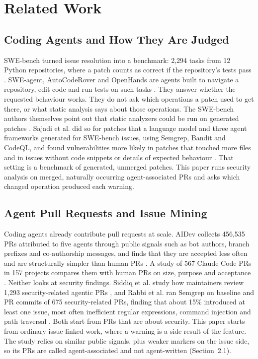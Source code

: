 \documentclass[acmsmall,screen,nonacm]{acmart}
\begin{document}
\section{Related Work}

\subsection{Coding Agents and How They Are Judged}

SWE-bench turned issue resolution into a benchmark: 2,294 tasks from 12 Python repositories, where a patch counts as correct if the repository's tests pass \cite{b9}. SWE-agent, AutoCodeRover and OpenHands are agents built to navigate a repository, edit code and run tests on such tasks \cite{b22,b25,b20}. They answer whether the requested behaviour works. They do not ask which operations a patch used to get there, or what static analysis says about those operations. The SWE-bench authors themselves point out that static analyzers could be run on generated patches \cite{b9}. Sajadi et al. did so for patches that a language model and three agent frameworks generated for SWE-bench issues, using Semgrep, Bandit and CodeQL, and found vulnerabilities more likely in patches that touched more files and in issues without code snippets or details of expected behaviour \cite{b36}. That setting is a benchmark of generated, unmerged patches. This paper runs security analysis on merged, naturally occurring agent-associated PRs and asks which changed operation produced each warning.

\subsection{Agent Pull Requests and Issue Mining}

Coding agents already contribute pull requests at scale. AIDev collects 456,535 PRs attributed to five agents through public signals such as bot authors, branch prefixes and co-authorship messages, and finds that they are accepted less often and are structurally simpler than human PRs \cite{b11}. A study of 567 Claude Code PRs in 157 projects compares them with human PRs on size, purpose and acceptance \cite{b21}. Neither looks at security findings. Siddiq et al. study how maintainers review 1,293 security-related agentic PRs \cite{b38}, and Rabbi et al. ran Semgrep on baseline and PR commits of 675 security-related PRs, finding that about 15\% introduced at least one issue, most often inefficient regular expressions, command injection and path traversal \cite{b37}. Both start from PRs that are about security. This paper starts from ordinary issue-linked work, where a warning is a side result of the feature. The study relies on similar public signals, plus weaker markers on the issue side, so its PRs are called agent-associated and not agent-written (Section~2.1).
\end{document}
